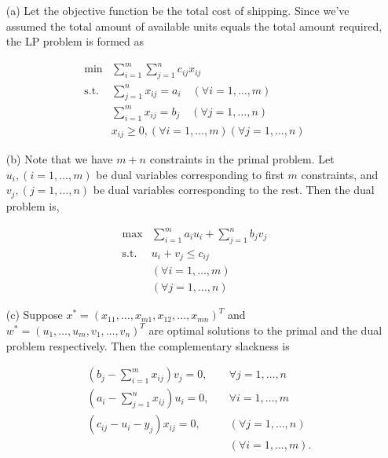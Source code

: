 \documentclass[12pt]{article}
\begin{document}
\begin{enumerate}
\item[(a)]
Let the objective function be the total cost of shipping. Since we've assumed the total amount of available units equals the total amount required, the LP problem is formed as

	\begin{equation*}
	\begin{array}{rl}
	\min & \sum_{i=1}^m\sum_{j=1}^n c_{ij}x_{ij} \\
	\text{s.t.} & \sum_{j=1}^n x_{ij} = a_i \quad (\forall i = 1, \dots, m) \\
	& \sum_{i=1}^m x_{ij} = b_j \quad (\forall j = 1, \dots, n )\\
	& x_{ij} \geq 0, (\forall i = 1, \dots, m) (\forall j = 1, \dots, n )
	\end{array}
	\end{equation*}
\item[(b)]
Note that we have $m+n$ constraints in the primal problem. Let $u_i, (i = 1, \dots, m)$ be dual variables corresponding to first $m$ constraints, and $v_j, (j = 1, \dots, n)$ be dual variables corresponding to the rest. Then the dual problem is,

	\begin{equation*}
	\begin{array}{rl}
	\max & \sum_{i=1}^m a_iu_i + \sum_{j=1}^n b_{j}v_{j} \\
	\text{s.t.} & u_i + v_j \leqslant c_{ij}  \\
	& (\forall i = 1, \dots, m) \\
	&(\forall j = 1, \dots, n )
	\end{array}
	\end{equation*}

\item[(c)]
Suppose $x^* = (x_11, \dots, x_{m1}, x_{12}, \dots, x_{mn})^T$ and $w^* = (u_1, \dots, u_m,v_1, \dots, v_n)^T$ are optimal solutions to the primal and the dual problem respectively. Then the complementary slackness is

\begin{equation*}
\begin{aligned}
&(b_j - \sum_{i=1}^m x_{ij})v_j = 0, \quad & \forall j = 1, \dots, n \\
&(a_i - \sum_{j=1}^n x_{ij})u_i = 0, \quad &\forall i = 1, \dots, m \\
&(c_{ij} - u_i - y_j)x_{ij} = 0, \quad &(\forall j = 1, \dots, n)\\
& & (\forall i = 1, \dots, m).
\end{aligned}
\end{equation*}


\end{enumerate}
\end{document}
